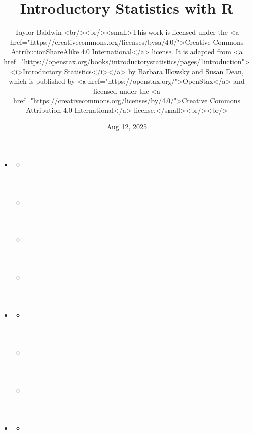 \documentclass[letterpaper,10pt,english]{jupyterBook}
\title{Introductory Statistics with R}
\date{Aug 12, 2025}
\author{Taylor Baldwin <br/><br/><small>This work is licensed under the <a href="https://creativecommons.org/licenses/by\sphinxhyphen{}sa/4.0/">Creative Commons Attribution\sphinxhyphen{}ShareAlike 4.0 International</a> license.\@{} It is adapted from  <a href="https://openstax.org/books/introductory\sphinxhyphen{}statistics/pages/1\sphinxhyphen{}introduction"><i>Introductory Statistics</i></a> by Barbara Illowsky and Susan Dean, which is published by <a href="https://openstax.org/">OpenStax</a> and licensed under the <a href="https://creativecommons.org/licenses/by/4.0/">Creative Commons Attribution 4.0 International</a> license.</small><br/><br/>}
\begin{document}
\pagestyle{empty}
\sphinxmaketitle
\pagestyle{plain}
\sphinxtableofcontents
\pagestyle{normal}
\label{\detokenize{README::doc}}

\begin{itemize}
\item {} 
\sphinxAtStartPar
{\hyperref[\detokenize{Ch1 Sampling and Data/1.0 Sampling and Data::doc}]{}}
\begin{itemize}
\item {} 
\sphinxAtStartPar
{\hyperref[\detokenize{Ch1 Sampling and Data/1.1 Key Terms in Statistics::doc}]{}}

\item {} 
\sphinxAtStartPar
{\hyperref[\detokenize{Ch1 Sampling and Data/1.2 Scales of Measurement::doc}]{}}

\item {} 
\sphinxAtStartPar
{\hyperref[\detokenize{Ch1 Sampling and Data/1.3 Sampling Techniques::doc}]{}}

\item {} 
\sphinxAtStartPar
{\hyperref[\detokenize{Ch1 Sampling and Data/1.4 Tables and Charts::doc}]{}}

\end{itemize}

\item {} 
\sphinxAtStartPar
{\hyperref[\detokenize{Ch2 Descriptive Statistics/2.0 Descriptive Statistics::doc}]{}}
\begin{itemize}
\item {} 
\sphinxAtStartPar
{\hyperref[\detokenize{Ch2 Descriptive Statistics/2.1 Measures of Position::doc}]{}}

\item {} 
\sphinxAtStartPar
{\hyperref[\detokenize{Ch2 Descriptive Statistics/2.2 Measures of Central Tendency::doc}]{}}

\item {} 
\sphinxAtStartPar
{\hyperref[\detokenize{Ch2 Descriptive Statistics/2.3 Measures of Dispersion::doc}]{}}

\end{itemize}

\item {} 
\sphinxAtStartPar
{\hyperref[\detokenize{Ch3 Probability/3.0 Probability::doc}]{}}
\begin{itemize}
\item {} 
\sphinxAtStartPar
{\hyperref[\detokenize{Ch3 Probability/3.1 Introduction to Probability::doc}]{}}


\end{itemize}
\end{itemize}
\end{document}
